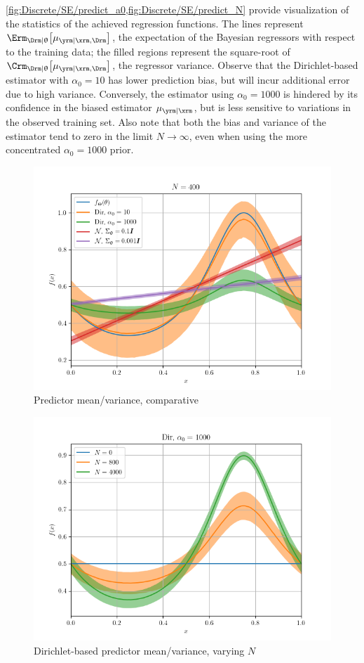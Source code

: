 \documentclass[12pt]{report}
\begin{document}
\cref{fig:Discrete/SE/predict_a0,fig:Discrete/SE/predict_N} provide visualization of the statistics of the achieved regression functions. The lines represent $\Erm_{\Drm | \uptheta}\big[\mu_{\yrm | \xrm, \Drm}\big]$, the expectation of the Bayesian regressors with respect to the training data; the filled regions represent the square-root of $\Crm_{\Drm | \uptheta}\big[\mu_{\yrm | \xrm, \Drm}\big]$, the regressor variance. Observe that the Dirichlet-based estimator with $\alpha_0 = 10$ has lower prediction bias, but will incur additional error due to high variance. Conversely, the estimator using $\alpha_0 = 1000$ is hindered by its confidence in the biased estimator $\mu_{\yrm | \xrm}$, but is less sensitive to variations in the observed training set. Also note that both the bias and variance of the estimator tend to zero in the limit $N \to \infty$, even when using the more concentrated $\alpha_0 = 1000$ prior.
\begin{figure}
	\centering
	\includegraphics[width=0.8\linewidth]{Discrete/SE/predict_a0.png}
	\caption{Predictor mean/variance, comparative}
	\label{fig:Discrete/SE/predict_a0}
\end{figure}
\begin{figure}
	\centering
	\includegraphics[width=0.8\linewidth]{Discrete/SE/predict_N.png}
	\caption{Dirichlet-based predictor mean/variance, varying $N$}
	\label{fig:Discrete/SE/predict_N}
\end{figure}
\end{document}
